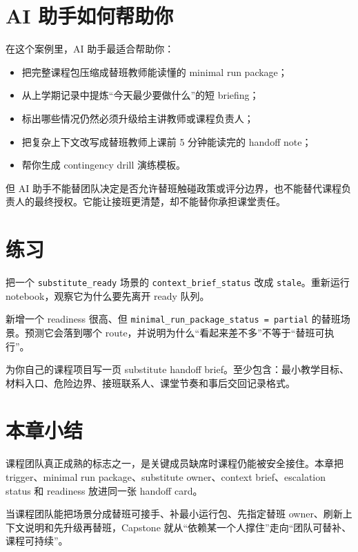 \section{AI 助手如何帮助你}

在这个案例里，AI 助手最适合帮助你：

\begin{itemize}
    \item 把完整课程包压缩成替班教师能读懂的 minimal run package；
    \item 从上学期记录中提炼“今天最少要做什么”的短 briefing；
    \item 标出哪些情况仍然必须升级给主讲教师或课程负责人；
    \item 把复杂上下文改写成替班教师上课前 5 分钟能读完的 handoff note；
    \item 帮你生成 contingency drill 演练模板。
\end{itemize}

但 AI 助手不能替团队决定是否允许替班触碰政策或评分边界，也不能替代课程负责人的最终授权。它能让接班更清楚，却不能替你承担课堂责任。

\section{练习}

\begin{exercisebox}[基础练习]
把一个 \texttt{substitute\_ready} 场景的 \texttt{context\_brief\_status} 改成 \texttt{stale}。重新运行 notebook，观察它为什么要先离开 ready 队列。
\end{exercisebox}

\begin{exercisebox}[进阶练习]
新增一个 readiness 很高、但 \texttt{minimal\_run\_package\_status = partial} 的替班场景。预测它会落到哪个 route，并说明为什么“看起来差不多”不等于“替班可执行”。
\end{exercisebox}

\begin{exercisebox}[开放练习]
为你自己的课程项目写一页 substitute handoff brief。至少包含：最小教学目标、材料入口、危险边界、接班联系人、课堂节奏和事后交回记录格式。
\end{exercisebox}

\section{本章小结}

课程团队真正成熟的标志之一，是关键成员缺席时课程仍能被安全接住。本章把 trigger、minimal run package、substitute owner、context brief、escalation status 和 readiness 放进同一张 handoff card。

当课程团队能把场景分成替班可接手、补最小运行包、先指定替班 owner、刷新上下文说明和先升级再替班，Capstone 就从“依赖某一个人撑住”走向“团队可替补、课程可持续”。
